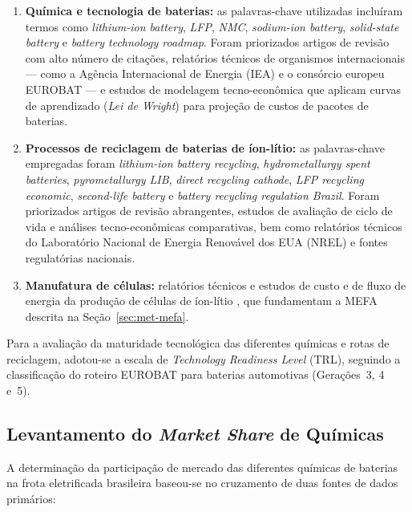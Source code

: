 \begin{enumerate}
    \item \textbf{Química e tecnologia de baterias:} as palavras-chave utilizadas
    incluíram termos como \textit{lithium-ion battery}, \textit{LFP}, \textit{NMC},
    \textit{sodium-ion battery}, \textit{solid-state battery} e \textit{battery
    technology roadmap}. Foram priorizados artigos de revisão com alto número de
    citações, relatórios técnicos de organismos internacionais — como a Agência
    Internacional de Energia (IEA) e o consórcio europeu EUROBAT — e estudos de
    modelagem tecno-econômica que aplicam curvas de aprendizado
    (\textit{Lei de Wright}) para projeção de custos de pacotes de baterias.

    \item \textbf{Processos de reciclagem de baterias de íon-lítio:} as
    palavras-chave empregadas foram \textit{lithium-ion battery recycling},
    \textit{hydrometallurgy spent batteries}, \textit{pyrometallurgy LIB},
    \textit{direct recycling cathode}, \textit{LFP recycling economic},
    \textit{second-life battery} e \textit{battery recycling regulation Brazil}.
    Foram priorizados artigos de revisão abrangentes, estudos de avaliação de ciclo
    de vida e análises tecno-econômicas comparativas, bem como relatórios técnicos
    do Laboratório Nacional de Energia Renovável dos EUA (NREL) e fontes
    regulatórias nacionais.

    \item \textbf{Manufatura de células:} relatórios técnicos e estudos de custo e
    de fluxo de energia da produção de células de íon-lítio
    \cite{knehr2022batpac,degen2022,erakca2021,dai2019}, que fundamentam a MEFA
    descrita na Seção~\ref{sec:met-mefa}.
\end{enumerate}

Para a avaliação da maturidade tecnológica das diferentes químicas e rotas de
reciclagem, adotou-se a escala de \textit{Technology Readiness Level} (TRL),
seguindo a classificação do roteiro EUROBAT para baterias automotivas
(Gerações~3, 4 e~5).

\subsection{Levantamento do \textit{Market Share} de Químicas}
\label{sec:met-marketshare}

A determinação da participação de mercado das diferentes químicas de baterias na
frota eletrificada brasileira baseou-se no cruzamento de duas fontes de dados
primários:

